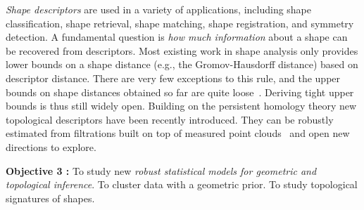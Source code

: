 {\em Shape descriptors} are used in a variety of applications, including shape classification, shape retrieval, shape matching, shape registration, and symmetry detection.  %
A fundamental question is {\em how much information} about a shape can be recovered from descriptors. Most existing work in shape analysis only provides lower bounds on a shape distance (e.g., the Gromov-Hausdorff distance) based on descriptor distance. There are very few exceptions to this rule, and the upper bounds on shape distances obtained so far are quite loose~\cite{bbk-gmds-06,ms-gh-05}. Deriving tight upper bounds is thus still widely open. 
Building on the persistent homology theory new topological descriptors have been recently introduced. They can be robustly estimated from filtrations built on top of measured point clouds~\cite{ccgmo-ghsssp-09, socg-pbsds-10}  and open new directions to explore.



\vspace{2mm}

{\bf Objective 3 :} To study new {\em robust statistical models for geometric and topological inference}.  To cluster data with a geometric prior. To study topological signatures of shapes.

